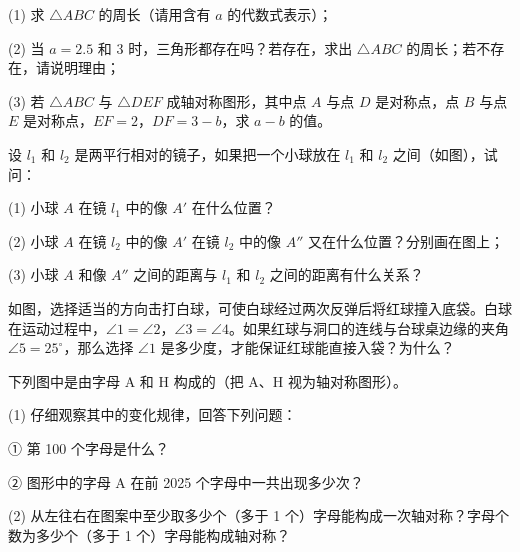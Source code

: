 (1) 求 $\triangle ABC$ 的周长（请用含有 $a$ 的代数式表示）；

(2) 当 $a = 2.5$ 和 $3$ 时，三角形都存在吗？若存在，求出 $\triangle ABC$ 的周长；若不存在，请说明理由；

(3) 若 $\triangle ABC$ 与 $\triangle DEF$ 成轴对称图形，其中点 $A$ 与点 $D$ 是对称点，点 $B$ 与点 $E$ 是对称点，$EF = 2$，$DF = 3 - b$，求 $a - b$ 的值。

\vspace{4cm}

\item 设 $l_1$ 和 $l_2$ 是两平行相对的镜子，如果把一个小球放在 $l_1$ 和 $l_2$ 之间（如图），试问：


\vspace{5cm}

(1) 小球 $A$ 在镜 $l_1$ 中的像 $A'$ 在什么位置？

(2) 小球 $A$ 在镜 $l_2$ 中的像 $A'$ 在镜 $l_2$ 中的像 $A''$ 又在什么位置？分别画在图上；

(3) 小球 $A$ 和像 $A''$ 之间的距离与 $l_1$ 和 $l_2$ 之间的距离有什么关系？

\item 如图，选择适当的方向击打白球，可使白球经过两次反弹后将红球撞入底袋。白球在运动过程中，$\angle 1 = \angle 2$，$\angle 3 = \angle 4$。如果红球与洞口的连线与台球桌边缘的夹角 $\angle 5 = 25^\circ$，那么选择 $\angle 1$ 是多少度，才能保证红球能直接入袋？为什么？




\vspace{5cm}

\item 下列图中是由字母 A 和 H 构成的（把 A、H 视为轴对称图形）。



(1) 仔细观察其中的变化规律，回答下列问题：

① 第 100 个字母是什么？

② 图形中的字母 A 在前 2025 个字母中一共出现多少次？

(2) 从左往右在图案中至少取多少个（多于 1 个）字母能构成一次轴对称？字母个数为多少个（多于 1 个）字母能构成轴对称？

\vspace{4cm}

